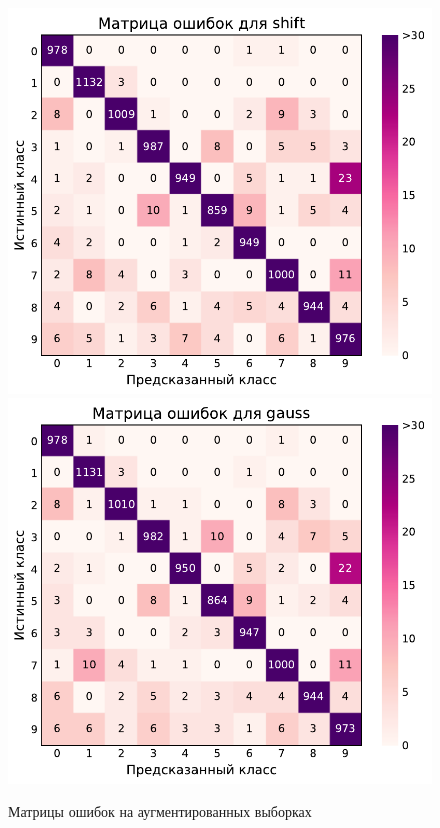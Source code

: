 \documentclass[12pt]{article}
\begin{document}
\begin{figure}[!h]
    \includegraphics[scale=0.6]{5_aug_conf_mat_shift.pdf}
    \includegraphics[scale=0.6]{5_aug_conf_mat_gauss.pdf}
    \caption{Матрицы ошибок на аугментированных выборках}
    \label{fig:5_aug_conf_mat_1}
\end{figure}
\end{document}
